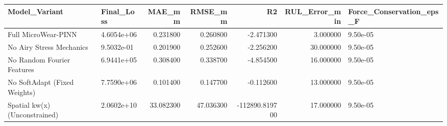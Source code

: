 \begin{tabular}{llrrrrl}
\toprule
Model_Variant & Final_Loss & MAE_mm & RMSE_mm & R2 & RUL_Error_min & Force_Conservation_eps_F \\
\midrule
Full MicroWear-PINN & 4.6054e+06 & 0.231800 & 0.260800 & -2.471300 & 3.000000 & 9.50e-05 \\
No Airy Stress Mechanics & 9.5032e-01 & 0.201900 & 0.252600 & -2.256200 & 30.000000 & 9.50e-05 \\
No Random Fourier Features & 6.9441e+05 & 0.308400 & 0.338700 & -4.854500 & 16.000000 & 9.50e-05 \\
No SoftAdapt (Fixed Weights) & 7.7590e+06 & 0.101400 & 0.147700 & -0.112600 & 13.000000 & 9.50e-05 \\
Spatial kw(x) (Unconstrained) & 2.0602e+10 & 33.082300 & 47.036300 & -112890.819700 & 17.000000 & 9.50e-05 \\
\bottomrule
\end{tabular}
